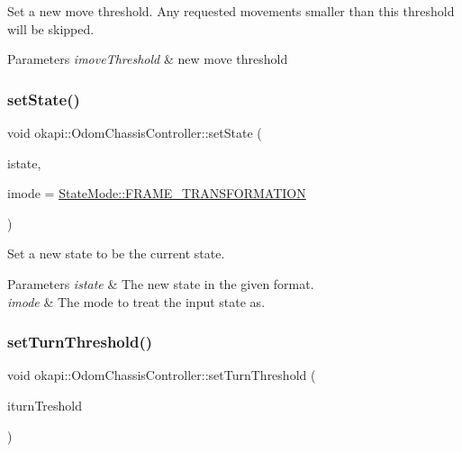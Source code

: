 Set a new move threshold. Any requested movements smaller than this threshold will be skipped.


\begin{DoxyParams}{Parameters}
{\em imove\+Threshold} & new move threshold \\
\hline
\end{DoxyParams}
\mbox{\label{classokapi_1_1OdomChassisController_a843ab24d9ed26ba68833ece0b28bf345}} 
\subsubsection{\texorpdfstring{setState()}{setState()}}
{\footnotesize\ttfamily void okapi\+::\+Odom\+Chassis\+Controller\+::set\+State (\begin{DoxyParamCaption}\item[{const \mbox{\hyperlink{structokapi_1_1OdomState}{Odom\+State}} \&}]{istate,  }\item[{const \mbox{\hyperlink{namespaceokapi_af37fbd761bd859a00ff4dd4a87dd8c07}{State\+Mode}} \&}]{imode = {\ttfamily \mbox{\hyperlink{namespaceokapi_af37fbd761bd859a00ff4dd4a87dd8c07ad5ed7666e5cebf60d3af20a5a46edf3b}{State\+Mode\+::\+F\+R\+A\+M\+E\+\_\+\+T\+R\+A\+N\+S\+F\+O\+R\+M\+A\+T\+I\+ON}}} }\end{DoxyParamCaption})\hspace{0.3cm}{\ttfamily [virtual]}}

Set a new state to be the current state.


\begin{DoxyParams}{Parameters}
{\em istate} & The new state in the given format. \\
\hline
{\em imode} & The mode to treat the input state as. \\
\hline
\end{DoxyParams}
\mbox{\label{classokapi_1_1OdomChassisController_a771daa37b47909a523571e9173f676d5}} 
\subsubsection{\texorpdfstring{setTurnThreshold()}{setTurnThreshold()}}
{\footnotesize\ttfamily void okapi\+::\+Odom\+Chassis\+Controller\+::set\+Turn\+Threshold (\begin{DoxyParamCaption}\item[{const Q\+Angle \&}]{iturn\+Treshold }\end{DoxyParamCaption})\hspace{0.3cm}{\ttfamily [virtual]}}

